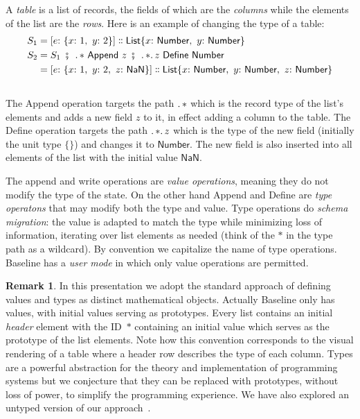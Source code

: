 \documentclass[english,submission]{programming}
\theoremstyle{definition}
\newtheorem*{remark}{Remark}
\newcommand{\mathbox}[1]{\colorbox{black!10}{$#1$\phantom{i\hspace{-3.5pt}}}}
\DeclareMathOperator{\exec}{\ \fatsemi\ \ }
\newcommand{\is}{{:}\ }
\newcommand{\comma}{,\ }
\newcommand{\isa}{\dblcolon}
\begin{document}
A \textit{table} is a list of records, the fields of which are the \textit{columns} while the elements of the list are the \textit{rows}. Here is an example of changing the type of a table:
\begin{align*}
S_1 &= [e \is \{x \is 1 \comma  y \is 2\}] \isa \textsf{List} \{x \is \textsf{Number}\comma  y \is \textsf{Number}\}\\
S_2 &= S_1 \exec \ldotp * \textsf{ Append } z \exec \ldotp * \ldotp z \textsf{ Define Number}\\
 &= [e \is \{x \is 1\comma  y \is 2,\ z\is \textsf{NaN}\}] \isa \textsf{List} \{x \is \textsf{Number}\comma  y \is \textsf{Number}\comma z\is \textsf{Number}\}\\
\end{align*}
\vspace{-30pt}\\
The \textsf{Append} operation targets the path \mathbox{\ldotp *} which is the record type of the list's elements and adds a new field \mathbox{z} to it, in effect adding a column to the table. The \textsf{Define} operation targets the path \mathbox{\ldotp  * \ldotp z} which is the type of the new field (initially the unit type \mathbox{\{\}}) and changes it to \mathbox{\textsf{Number}}. The new field is also inserted into all elements of the list with the initial value \mathbox{\textsf{NaN}}.

The \textsf{append} and \textsf{write} operations are \textit{value operations}, meaning they do not modify the type of the state. On the other hand \textsf{Append} and \textsf{Define} are \textit{type operatons} that may modify both the type and value. Type operations do \textit{schema migration}: the value is adapted to match the type while minimizing loss of information, iterating over list elements as needed (think of the \mathbox{*} in the type path as a wildcard). By convention we capitalize the name of type operations. Baseline has a \textit{user mode} in which only value operations are permitted.

\begin{remark}
In this presentation we adopt the standard approach of defining values and types as distinct mathematical objects. Actually Baseline only has values, with initial values serving as prototypes. Every list contains an initial \textit{header} element with the ID~\mathbox{*} containing an initial value which serves as the prototype of the list elements. Note how this convention corresponds to the visual rendering of a table where a header row describes the type of each column. Types are a powerful abstraction for the theory and implementation of programming systems but we conjecture that they can be replaced with prototypes, without loss of power, to simplify the programming experience. We have also explored an untyped version of our approach~\cite{denicek}.
\end{remark}
\end{document}
